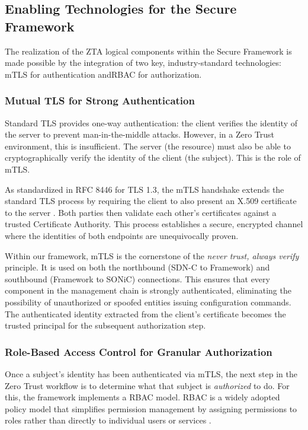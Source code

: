 \documentclass[12pt, a4paper, reqno, oneside]{book}
\begin{document}
\subsection{Enabling Technologies for the Secure Framework}
\label{sec:enabling_technologies}

The realization of the ZTA logical components within the Secure Framework is made possible by the integration of two key, industry-standard technologies: mTLS for authentication andRBAC for authorization.

\subsubsection{Mutual TLS for Strong Authentication}
\label{sec:mtls}
Standard TLS provides one-way authentication: the client verifies the identity of the server to prevent man-in-the-middle attacks. However, in a Zero Trust environment, this is insufficient. The server (the resource) must also be able to cryptographically verify the identity of the client (the subject). This is the role of mTLS.

As standardized in RFC 8446 for TLS 1.3, the mTLS handshake extends the standard TLS process by requiring the client to also present an X.509 certificate to the server \cite{rescorla_tls_2018}. Both parties then validate each other's certificates against a trusted Certificate Authority. This process establishes a secure, encrypted channel where the identities of both endpoints are unequivocally proven.

Within our framework, mTLS is the cornerstone of the \textit{never trust, always verify} principle. It is used on both the northbound (SDN-C to Framework) and southbound (Framework to SONiC) connections. This ensures that every component in the management chain is strongly authenticated, eliminating the possibility of unauthorized or spoofed entities issuing configuration commands. The authenticated identity extracted from the client's certificate becomes the trusted principal for the subsequent authorization step.

\subsubsection{Role-Based Access Control for Granular Authorization}
\label{sec:rbac}
Once a subject's identity has been authenticated via mTLS, the next step in the Zero Trust workflow is to determine what that subject is \textit{authorized} to do. For this, the framework implements a RBAC model. RBAC is a widely adopted policy model that simplifies permission management by assigning permissions to roles rather than directly to individual users or services \cite{ferraiolo_proposed_1992}.
\end{document}
